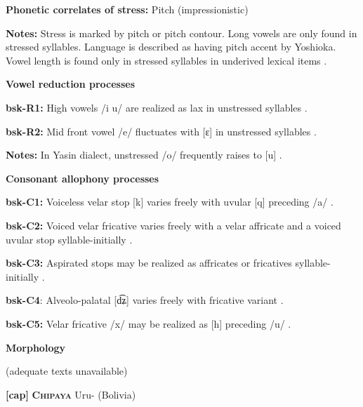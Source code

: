 \textbf{Phonetic correlates of stress:} Pitch (impressionistic)



\textbf{Notes:} Stress is marked by pitch or pitch contour. Long vowels are only found in stressed syllables. Language is described as having pitch accent by Yoshioka. Vowel length is found only in stressed syllables in underived lexical items \citep{Anderson1028}.



\textbf{Vowel reduction processes}



\textbf{bsk-R1:} High vowels /i u/ are realized as lax in unstressed syllables \citep[1029]{Anderson1997}.



\textbf{bsk-R2:} Mid front vowel /e/ fluctuates with [ɛ] in unstressed syllables \citep[1029]{Anderson1997}.



\textbf{Notes:} In Yasin dialect, unstressed /o/ frequently raises to [u] \citep[1038]{Anderson1997}.



\textbf{Consonant allophony processes}



\textbf{bsk-C1:} Voiceless velar stop [k] varies freely with uvular [q] preceding /a/ \citep[1025]{Anderson1997}.



\textbf{bsk-C2:} Voiced velar fricative varies freely with a velar affricate and a voiced uvular stop syllable-initially \citep[1025]{Anderson1997}.



\textbf{bsk-C3:} Aspirated stops may be realized as affricates or fricatives syllable-initially \citep[1025]{Anderson1997}.



\textbf{bsk-C4}: Alveolo-palatal [d͡ʑ] varies freely with fricative variant \citep[1025]{Anderson1997}.



\textbf{bsk-C5:} Velar fricative /x/ may be realized as [h] preceding /u/ \citep[1025]{Anderson1997}.



\textbf{Morphology}



(adequate texts unavailable)



\textbf{[cap]}   \textbf{\textsc{Chipaya}}  Uru- (Bolivia)



